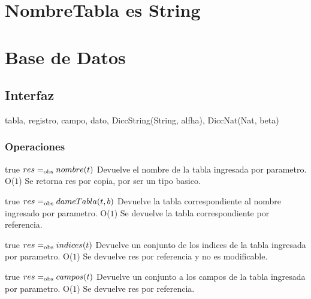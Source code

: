 


\section{NombreTabla es String}

\section{Base de Datos}

\subsection{Interfaz}

 {tabla, registro, campo, dato,}{ DiccString(String, alfha), DiccNat(Nat, beta)}


\subsubsection*{Operaciones}


%
 {true}
 {$res =_{\mathrm{obs}} nombre(t)$}
 {Devuelve el nombre de la tabla ingresada por parametro.}
 {O($1$)}
 {Se retorna res por copia, por ser un tipo basico.}

 {true}
 {$res =_{\mathrm{obs}} dameTabla(t,b)$}
 {Devuelve la tabla correspondiente al nombre ingresado por parametro.}
 {O($1$)}
 {Se devuelve la tabla correspondiente por referencia.}

 {true}
 {$res =_{\mathrm{obs}} indices(t)$}
 {Devuelve un conjunto de los indices de la tabla ingresada por parametro.}
 {O($1$)}
 {Se devuelve res por referencia y no es modificable.}
 
 {true}
 {$res =_{\mathrm{obs}} campos(t)$}
 {Devuelve un conjunto a los campos de la tabla ingresada por parametro.}
 {O($1$)}
 {Se devuelve res por referencia.}

